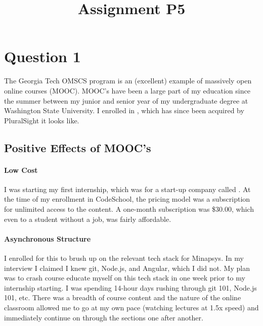 

\title{Assignment P5\\}



\maketitle
\thispagestyle{fancy}

\section{Question 1}

The Georgia Tech OMSCS program is an (excellent) example of massively open online courses (MOOC). MOOC's have been a large part of my education since the summer between my junior and senior year of my undergraduate degree at Washington State University. I enrolled in , which has since been acquired by PluralSight it looks like.

\subsection{Positive Effects of MOOC's}

\paragraph{Low Cost}
I was starting my first internship, which was for a start-up company called . At the time of my enrollment in CodeSchool, the pricing model was a subscription for unlimited access to the content. A one-month subscription was \$30.00, which even to a student without a job, was fairly affordable.

\paragraph{Asynchronous Structure}
I enrolled for this to brush up on the relevant tech stack for Minapsys. In my interview I claimed I knew git, Node.js, and Angular, which I did not. My plan was to crash course educate myself on this tech stack in one week prior to my internship starting. I was spending 14-hour days rushing through git 101, Node.js 101, etc. There was a breadth of course content and the nature of the online classroom allowed me to go at my own pace (watching lectures at 1.5x speed) and immediately continue on through the sections one after another.

